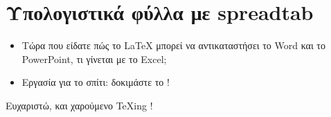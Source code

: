 \documentclass{beamer}
\begin{document}
\section{Υπολογιστικά φύλλα με \textlatin{{spreadtab}}}

\begin{frame}[fragile]{\insertsection}
\begin{itemize}
\item
Τώρα που είδατε πώς το \LaTeX{} μπορεί να αντικαταστήσει το \en Word \gr και το \en PowerPoint, \gr τι γίνεται με το \en Excel;\gr
\item Εργασία για το σπίτι: δοκιμάστε το !
\end{itemize}
\end{frame}

\begin{frame}
\begin{center}
Ευχαριστώ, και χαρούμενο  \TeX{}\en ing \gr!
\end{center}
\end{frame}
\end{document}

